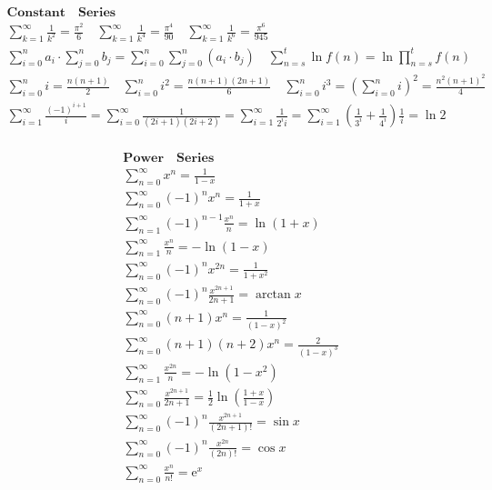 \documentclass{article}
\begin{document}
\clearpage

\begin{align*}
    \bm{Constant \quad Series} \\  
    \sum_{k=1}^{\infty}{\frac{1}{k^2}} = \frac{\pi^2}{6} \quad \sum_{k=1}^{\infty}{\frac{1}{k^4}} = \frac{\pi^4}{90} \quad \sum_{k=1}^{\infty}{\frac{1}{k^6}} = \frac{\pi^6}{945} \\ 
    \sum_{i=0}^{n}{a_{i}} \cdot \sum_{j=0}^{n}{b_{j}} = \sum_{i=0}^{n}\sum_{j=0}^{n}{(a_{i} \cdot b_{j})} \quad \sum_{n=s}^{t}\ln{f(n)} = \ln{\prod_{n=s}^{t}}f(n) \\ 
    \sum_{i=0}^{n}{i} = \frac{n(n+1)}{2} \quad \sum_{i=0}^{n}{i^2} = \frac{n(n+1)(2n+1)}{6} \quad \sum_{i=0}^{n}{i^3} = (\sum_{i=0}^{n}{i})^2 = \frac{n^2(n+1)^2}{4} \\ 
    \sum_{i=1}^{\infty}{\frac{(-1)^{i+1}}{i}} = \sum_{i=0}^{\infty}{\frac{1}{(2i+1)(2i+2)}} = \sum_{i=1}^{\infty}{\frac{1}{2^i i}} = \sum_{i=1}^{\infty}({\frac{1}{3^i}+\frac{1}{4^i}})\frac{1}{i}= \ln2 \\ 
\end{align*}

\clearpage

\begin{align*}
    \bm{Power \quad Series} \\ 
    \sum_{n=0}^{\infty}{x^n} = \frac{1}{1-x} \\ 
    \sum_{n=0}^{\infty}{(-1)^nx^n} = \frac{1}{1+x} \\ 
    \sum_{n=1}^{\infty}{(-1)^{n-1}\frac{x^n}{n}} = \ln(1+x) \\ 
    \sum_{n=1}^{\infty}{\frac{x^n}{n}} = -\ln(1-x) \\ 
    \sum_{n=0}^{\infty}{(-1)^nx^{2n}} = \frac{1}{1+x^2} \\ 
    \sum_{n=0}^{\infty}{(-1)^{n}\frac{x^{2n+1}}{2n+1}} = \arctan x \\ 
    \sum_{n=0}^{\infty}{(n+1)x^n} = \frac{1}{(1-x)^2} \\ 
    \sum_{n=0}^{\infty}{(n+1)(n+2)x^n} = \frac{2}{(1-x)^3} \\
    \sum_{n=1}^{\infty}{\frac{x^{2n}}{n}} = -\ln(1-x^2) \\ 
    \sum_{n=0}^{\infty}{\frac{x^{2n+1}}{2n+1}} = \frac{1}{2}\ln(\frac{1+x}{1-x})\\  
    \sum_{n=0}^{\infty}{(-1)^{n} \frac{x^{2n+1}}{(2n+1)!}} = \sin x \\  
    \sum_{n=0}^{\infty}{(-1)^{n} \frac{x^{2n}}{(2n)!}} = \cos x \\  
    \sum_{n=0}^{\infty}{\frac{x^{n}}{n!}} =  \mathrm{e}^x \\ 
\end{align*}
\end{document}
